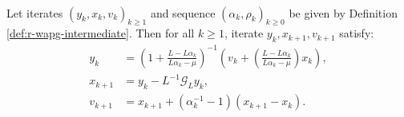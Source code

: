\documentclass[12pt]{article}
\begin{document}
        \begin{proposition}\label{prop:wagp-st-form}\;\\
            Let iterates $(y_k, x_{k}, v_{k})_{k \ge 1}$ and sequence $(\alpha_k, \rho_k)_{k \ge 0}$ be given by Definition \ref{def:r-wapg-intermediate}. 
            Then for all $k \ge 1$, iterate $y_k, x_{k + 1}, v_{k + 1}$
            satisfy: 
            \begin{align}
                y_{k} &= 
                \left(
                    1 + \frac{L - L\alpha_{k}}{L\alpha_{k} - \mu}
                \right)^{-1}
                \left(
                    v_{k} + 
                    \left(\frac{L - L\alpha_{k}}{L\alpha_{k} - \mu} \right) x_{k}
                \right), 
                \label{eqn:rwapg-st-form-eqn-1}
                \\
                x_{k + 1} &= 
                y_k - L^{-1} \mathcal G_L y_k, 
                \\
                v_{k + 1} &= x_{k + 1} + (\alpha_k^{-1} - 1)(x_{k + 1} - x_k). 
                \label{eqn:rwapg-st-form-eqn-3}
            \end{align}
        \end{proposition}
\end{document}
